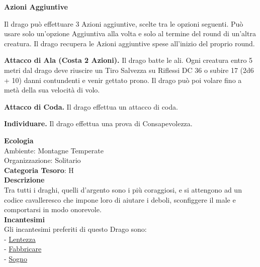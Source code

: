 \begin{multicols}{2}
{\textbf{Azioni Aggiuntive}

Il drago può effettuare 3 Azioni aggiuntive, scelte tra le opzioni seguenti. Può usare solo un'opzione Aggiuntiva alla volta e solo al termine del round di un'altra creatura. Il drago recupera le Azioni aggiuntive spese all'inizio del proprio round.

\textbf{Attacco di Ala (Costa 2 Azioni).} Il drago batte le ali. Ogni creatura entro 5 metri dal drago deve riuscire un Tiro Salvezza su Riflessi DC 36 o subire 17 (2d6 + 10) danni contundenti e venir gettato prono. Il drago può poi volare fino a metà della sua velocità di volo.

\textbf{Attacco di Coda.} Il drago effettua un attacco di coda.

\textbf{Individuare.} Il drago effettua una prova di Consapevolezza.

\textbf{Ecologia}\\
Ambiente: Montagne Temperate\\
Organizzazione: Solitario\\
\textbf{Categoria Tesoro}: H\\
\textbf{Descrizione}\\
Tra tutti i draghi, quelli d'argento sono i più coraggiosi, e si attengono ad un codice cavalleresco che impone loro di aiutare i deboli, sconfiggere il male e comportarsi in modo onorevole.\\
\textbf{Incantesimi}\\
Gli incantesimi preferiti di questo Drago sono:\\
- \hyperlink{lentezza}{Lentezza}\\
- \hyperlink{Fabbricare}{Fabbricare}\\
- \hyperlink{Sogno}{Sogno}

%

}
\end{multicols}
